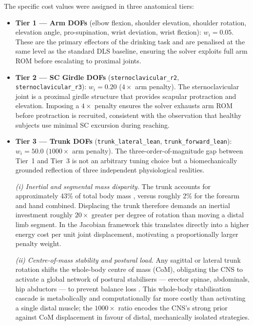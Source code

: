 \documentclass[journal,10pt,twocolumn]{IEEEtran}
\begin{document}
The specific cost values were assigned in three anatomical tiers:

\begin{itemize}
  \item \textbf{Tier 1 --- Arm DOFs} (elbow flexion, shoulder elevation,
        shoulder rotation, elevation angle, pro-supination, wrist
        deviation, wrist flexion): $w_i = 0.05$.
        These are the primary effectors of the drinking task and are
        penalised at the same level as the standard DLS baseline, ensuring
        the solver exploits full arm ROM before escalating to proximal joints.

  \item \textbf{Tier 2 --- SC Girdle DOFs}
        (\texttt{sternoclavicular\_r2}, \texttt{sternoclavicular\_r3}):
        $w_i = 0.20$ ($4\times$ arm penalty).
        The sternoclavicular joint is a proximal girdle structure that
        provides scapular protraction and elevation. Imposing a
        $4\times$ penalty ensures the solver exhausts arm ROM before
        protraction is recruited, consistent with the observation that healthy
        subjects use minimal SC excursion during reaching.

  \item \textbf{Tier 3 --- Trunk DOFs}
        (\texttt{trunk\_lateral\_lean}, \texttt{trunk\_forward\_lean}):
        $w_i = 50.0$ ($1000\times$ arm penalty).
        The three-order-of-magnitude gap between Tier~1 and Tier~3 is not an
        arbitrary tuning choice but a biomechanically grounded reflection of
        three independent physiological realities.

        \textit{(i) Inertial and segmental mass disparity.}
        The trunk accounts for approximately 43\% of total body mass
        \cite{dempster1955}, versus roughly 2\% for the forearm and hand
        combined. Displacing the trunk therefore demands an inertial
        investment roughly $20{\times}$ greater per degree of rotation than
        moving a distal limb segment. In the Jacobian framework this
        translates directly into a higher energy cost per unit joint
        displacement, motivating a proportionally larger penalty weight.

        \textit{(ii) Centre-of-mass stability and postural load.}
        Any sagittal or lateral trunk rotation shifts the whole-body centre
        of mass (CoM), obligating the CNS to activate a global network of
        postural stabilisers --- erector spinae, abdominals, hip abductors ---
        to prevent balance loss \cite{cirstea2000}. This whole-body
        stabilisation cascade is metabolically and computationally far more
        costly than activating a single distal muscle; the $1000\times$ ratio
        encodes the CNS's strong prior against CoM displacement in favour of
        distal, mechanically isolated strategies.


\end{itemize}
\end{document}
